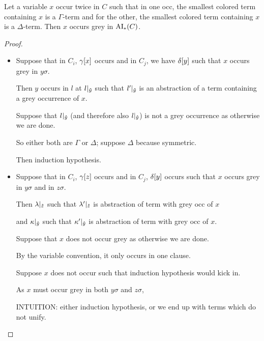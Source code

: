 \documentclass[,%
	paper=a4,%
	DIV10, %
	twoside=false,%
	liststotoc,
	bibtotoc,
	draft=false,%
	numbers=noendperiod
]{scrartcl}
\begin{document}
\begin{clemma}
	Let a variable $x$ occur twice in $C$ such that in one occ, the smallest colored term containing $x$ is a $\Gamma$-term and for the other, the smallest colored term containing $x$ is a $\Delta$-term.
	Then $x$ occurs grey in $\operatorname{AI}_\mathrm{*}(C)$.
\end{clemma}
\begin{proof}
	~
	\begin{itemize}
		\item
			Suppose that in $C_i$, $\gamma[x]$ occurs and in $C_j$, we have $\delta[y]$ such that $x$ occurs grey in $y\sigma$.

			Then $y$ occurs in $l$ at $l|_{\bm\hat y}$ such that $l'|_{\bm\hat y}$ is an abstraction of a term containing a grey occurrence of $x$.

			Suppose that $l|_{\bm\hat y}$ (and therefore also $l|_{\bm\hat y}$) is not a grey occurrence as otherwise we are done. 

			So either both are $\Gamma$ or $\Delta$; suppose $\Delta$ because symmetric. 

			Then induction hypothesis.


		\item 
			Suppose that in $C_i$, $\gamma[z]$ occurs and in $C_j$, $\delta[y]$ occurs such that $x$ occurs grey in $y\sigma$ and in $z\sigma$.

			Then $\lambda|_{\bm\hat z}$ such that $\lambda'|_{\bm\hat z}$ is abstraction of term with grey occ of $x$ 

			and $\kappa|_{\bm\hat y}$ such that $\kappa'|_{\bm\hat y}$ is abstraction of term with grey occ of $x$.

			Suppose that $x$ does not occur grey as otherwise we are done.

			By the variable convention, it only occurs in one clause.

			Suppose $x$ does not occur such that induction hypothesis would kick in.

			As $x$ must occur grey in both $y\sigma$ and $z\sigma$, 

			INTUITION: either induction hypothesis, or we end up with terms which do not unify.

	\end{itemize}
\end{proof}
\end{document}
